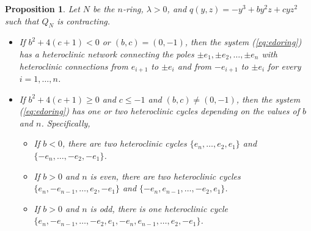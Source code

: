 \documentclass{article}
\newtheorem{prop}{Proposition}
\theoremstyle{definition}
\begin{document}
\begin{prop}\label{prop:hetcycle}
Let $N$ be the $n$-ring, $\lambda>0$, and $q(y,z)=-y^3+b y^2 z + c y z^2$ such that $Q_N$ is contracting.
\begin{itemize}

\item[(i)] If $b^2+4(c+1)<0$ or $(b,c)=(0,-1)$, then the system (\ref{eq:edoring}) has a heteroclinic network connecting the poles $\pm e_1, \pm e_2,\dots, \pm e_n$ with heteroclinic connections from $e_{i+1}$ to $\pm e_i$ and from $-e_{i+1}$ to $\pm e_i$ for every $i=1, \dots, n$. 

\item[(ii)] If $b^2+4(c+1)\geq 0$ and $c \leq -1$ and $(b,c)\neq (0,-1)$, then the system (\ref{eq:edoring}) has one or two heteroclinic cycles depending on the values of $b$ and $n$. Specifically, 
\begin{itemize}
\item[(ii.1)] If $b<0$, there are two heteroclinic cycles $\{e_n,\dots, e_2,e_1\}$ and $\{ -e_n,\dots, -e_2, -e_1\}$.

\item[(ii.2)] If $b>0$ and $n$ is even, there are two heteroclinic cycles $\{e_n,-e_{n-1},\dots, e_2,-e_1\}$ and $\{-e_n,e_{n-1},\dots, -e_2,e_1\}$.

\item[(ii.3)] If $b>0$ and $n$ is odd, there is one heteroclinic cycle \\$\{e_n,-e_{n-1},\dots, -e_2,e_1, -e_n, e_{n-1},\dots, e_2,-e_1\}$.  
\end{itemize}
\end{itemize}
\end{prop}
\end{document}
